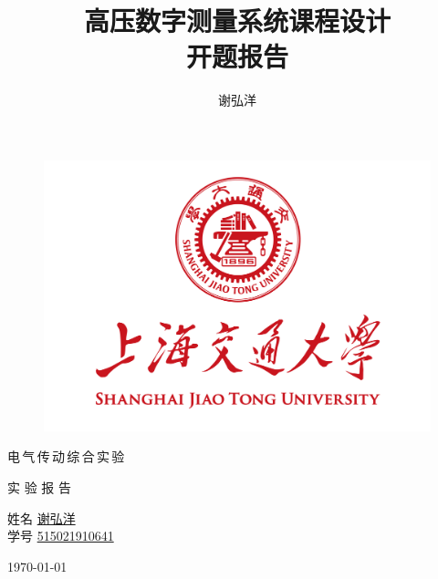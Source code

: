 \documentclass[a4paper,11pt]{ctexart}
\title
{
	\linespread{1.5} \zihao{4}
	高压数字测量系统课程设计 \\ 
	\zihao{2}
	开题报告
}
\author
{
	谢弘洋
}
\date{}
\begin{document}
	\pagestyle{plain}

\begin{figure}[t]
	\setlength{\abovecaptionskip}{-10mm}
	\setlength{\belowcaptionskip}{-60mm}
	\centering
	\includegraphics[scale=0.4]{page1.png}
\end{figure}

\begin{center}
	电\,气\,传\,动\,综\,合\,实\,验 \\
	\vspace{0.7em}
	
	实\hspace{0.5em} 验\hspace{0.5em} 报\hspace{0.5em} 告\\
	\vspace{3em}
		
	\hspace{2em}姓名\hspace{1em} \underline{\hspace{4em}谢弘洋\hspace{4em}}\\
	\vspace{1em}
	\hspace{2em}学号\hspace{1em} \underline{\hspace{2.75em}515021910641\hspace{2.75em}}\\
	\vspace{1em}
	
	
	\vspace{6em}
	\today
\end{center}
\newpage
\begin{spacing}{1.5}
	\tableofcontents
\end{spacing}
\end{document}
